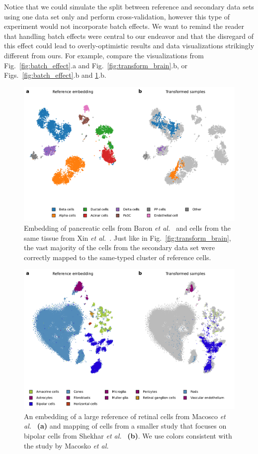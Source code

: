 \documentclass[runningheads]{llncs}
\newcommand{\etal}{\textit{et al.}}
\begin{document}
Notice that we could simulate the split between reference and secondary data
sets using one data set only and perform cross-validation, however this type of
experiment would not incorporate batch effects. We want to remind the reader
that handling batch effects were central to our endeavor and that the
disregard of this effect could lead to overly-optimistic results and data
visualizations strikingly different from ours. For example, compare the
visualizations from Fig.~\ref{fig:batch_effect}.a and
Fig.~\ref{fig:transform_brain}.b, or Figs.~\ref{fig:batch_effect}.b and
\ref{fig:transform_pancreas}.b.


\begin{figure}[htb]
  \includegraphics[width=\textwidth]{transform_pancreas.pdf}
  \caption{Embedding of pancreatic cells from Baron \etal~\cite{Baron2016} and
  cells from the same tissue from Xin \etal~\cite{Xin2016}. Just like in
  Fig.~\ref{fig:transform_brain}, the vast majority of the cells from the
  secondary data set were correctly mapped to the same-typed cluster of
  reference cells.}
  \label{fig:transform_pancreas}
\end{figure}


\begin{figure}[htb]
  \includegraphics[width=\textwidth]{transform_retina.pdf}
  \caption{An embedding of a large reference of retinal cells from Macosco
  \etal~\cite{Macosko2015} \textbf{(a)} and mapping of cells from a smaller study that
  focuses on bipolar cells from Shekhar \etal~\cite{Shekhar2016} \textbf{(b)}. We use
  colors consistent with the study by Macosko \etal}
  \label{fig:transform_retina}
\end{figure}
\end{document}
